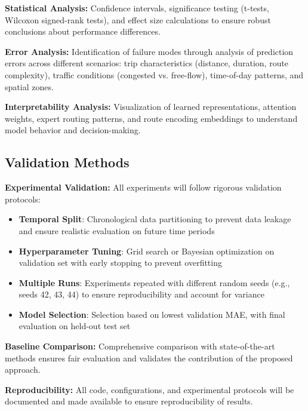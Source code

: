 \textbf{Statistical Analysis:} Confidence intervals, significance testing (t-tests, Wilcoxon signed-rank tests), and effect size calculations to ensure robust conclusions about performance differences.

\textbf{Error Analysis:} Identification of failure modes through analysis of prediction errors across different scenarios: trip characteristics (distance, duration, route complexity), traffic conditions (congested vs. free-flow), time-of-day patterns, and spatial zones.

\textbf{Interpretability Analysis:} Visualization of learned representations, attention weights, expert routing patterns, and route encoding embeddings to understand model behavior and decision-making.

\subsection{Validation Methods}

\textbf{Experimental Validation:} All experiments will follow rigorous validation protocols:
\begin{itemize}
    \item \textbf{Temporal Split}: Chronological data partitioning to prevent data leakage and ensure realistic evaluation on future time periods
    \item \textbf{Hyperparameter Tuning}: Grid search or Bayesian optimization on validation set with early stopping to prevent overfitting
    \item \textbf{Multiple Runs}: Experiments repeated with different random seeds (e.g., seeds 42, 43, 44) to ensure reproducibility and account for variance
    \item \textbf{Model Selection}: Selection based on lowest validation MAE, with final evaluation on held-out test set
\end{itemize}

\textbf{Baseline Comparison:} Comprehensive comparison with state-of-the-art methods ensures fair evaluation and validates the contribution of the proposed approach.

\textbf{Reproducibility:} All code, configurations, and experimental protocols will be documented and made available to ensure reproducibility of results.


